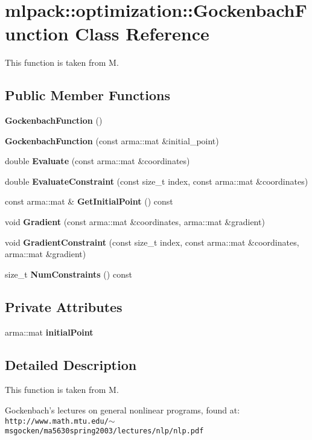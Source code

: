 \section{mlpack\-:\-:optimization\-:\-:Gockenbach\-Function Class Reference}
\label{classmlpack_1_1optimization_1_1GockenbachFunction}


This function is taken from M.  


\subsection*{Public Member Functions}
\begin{DoxyCompactItemize}
\item 
{\bf Gockenbach\-Function} ()
\item 
{\bf Gockenbach\-Function} (const arma\-::mat \&initial\-\_\-point)
\item 
double {\bf Evaluate} (const arma\-::mat \&coordinates)
\item 
double {\bf Evaluate\-Constraint} (const size\-\_\-t index, const arma\-::mat \&coordinates)
\item 
const arma\-::mat \& {\bf Get\-Initial\-Point} () const 
\item 
void {\bf Gradient} (const arma\-::mat \&coordinates, arma\-::mat \&gradient)
\item 
void {\bf Gradient\-Constraint} (const size\-\_\-t index, const arma\-::mat \&coordinates, arma\-::mat \&gradient)
\item 
size\-\_\-t {\bf Num\-Constraints} () const 
\end{DoxyCompactItemize}
\subsection*{Private Attributes}
\begin{DoxyCompactItemize}
\item 
arma\-::mat {\bf initial\-Point}
\end{DoxyCompactItemize}


\subsection{Detailed Description}
This function is taken from M. 

Gockenbach's lectures on general nonlinear programs, found at\-: {\tt http\-://www.\-math.\-mtu.\-edu/$\sim$msgocken/ma5630spring2003/lectures/nlp/nlp.\-pdf}

